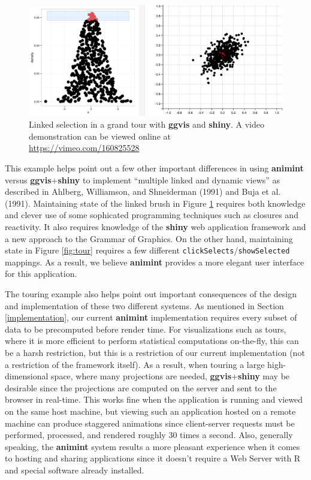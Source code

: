 \documentclass[12pt,]{article}
\theoremstyle{definition}
\theoremstyle{definition}
\theoremstyle{definition}
\theoremstyle{remark}
\begin{document}
\begin{figure}
\centering
\includegraphics{images/tourbrush}
\caption{\label{fig:tourbrush}Linked selection in a grand tour with
\textbf{ggvis} and \textbf{shiny}. A video demonstration can be viewed
online at \url{https://vimeo.com/160825528}}
\end{figure}

This example helps point out a few other important differences in using
\textbf{animint} versus \textbf{ggvis}+\textbf{shiny} to implement
``multiple linked and dynamic views'' as described in Ahlberg,
Williamson, and Shneiderman (1991) and Buja et al. (1991). Maintaining
state of the linked brush in Figure \ref{fig:tourbrush} requires both
knowledge and clever use of some sophicated programming techniques such
as closures and reactivity. It also requires knowledge of the
\textbf{shiny} web application framework and a new approach to the
Grammar of Graphics. On the other hand, maintaining state in Figure
\ref{fig:tour} requires a few different
\texttt{clickSelects}/\texttt{showSelected} mappings. As a result, we
believe \textbf{animint} provides a more elegant user interface for this
application.

The touring example also helps point out important consequences of the
design and implementation of these two different systems. As mentioned
in Section \ref{implementation}, our current \textbf{animint}
implementation requires every subset of data to be precomputed before
render time. For visualizations such as tours, where it is more
efficient to perform statistical computations on-the-fly, this can be a
harsh restriction, but this is a restriction of our current
implementation (not a restriction of the framework itself). As a result,
when touring a large high-dimensional space, where many projections are
needed, \textbf{ggvis}+\textbf{shiny} may be desirable since the
projections are computed on the server and sent to the browser in
real-time. This works fine when the application is running and viewed on
the same host machine, but viewing such an application hosted on a
remote machine can produce staggered animations since client-server
requests must be performed, processed, and rendered roughly 30 times a
second. Also, generally speaking, the \textbf{animint} system results a
more pleasant experience when it comes to hosting and sharing
applications since it doesn't require a Web Server with R and special
software already installed.
\end{document}
